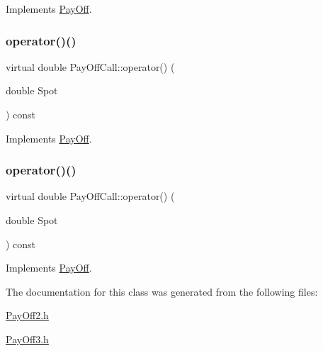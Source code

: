 Implements \hyperlink{classPayOff_ad8194d5b82247ae89c25c515f0ba806a}{Pay\+Off}.

\hypertarget{classPayOffCall_af6472a1bc2034da730d2375bf9750142}{}\label{classPayOffCall_af6472a1bc2034da730d2375bf9750142} 
\subsubsection{\texorpdfstring{operator()()}{operator()()}\hspace{0.1cm}{\footnotesize\ttfamily [1/2]}}
{\footnotesize\ttfamily virtual double Pay\+Off\+Call\+::operator() (\begin{DoxyParamCaption}\item[{double}]{Spot }\end{DoxyParamCaption}) const\hspace{0.3cm}{\ttfamily [virtual]}}



Implements \hyperlink{classPayOff_a5ae17d82c233ef5568c8fb0539703000}{Pay\+Off}.

\hypertarget{classPayOffCall_af6472a1bc2034da730d2375bf9750142}{}\label{classPayOffCall_af6472a1bc2034da730d2375bf9750142} 
\subsubsection{\texorpdfstring{operator()()}{operator()()}\hspace{0.1cm}{\footnotesize\ttfamily [2/2]}}
{\footnotesize\ttfamily virtual double Pay\+Off\+Call\+::operator() (\begin{DoxyParamCaption}\item[{double}]{Spot }\end{DoxyParamCaption}) const\hspace{0.3cm}{\ttfamily [virtual]}}



Implements \hyperlink{classPayOff_a5ae17d82c233ef5568c8fb0539703000}{Pay\+Off}.



The documentation for this class was generated from the following files\+:\begin{DoxyCompactItemize}
\item 
\hyperlink{PayOff2_8h}{Pay\+Off2.\+h}\item 
\hyperlink{PayOff3_8h}{Pay\+Off3.\+h}\end{DoxyCompactItemize}
